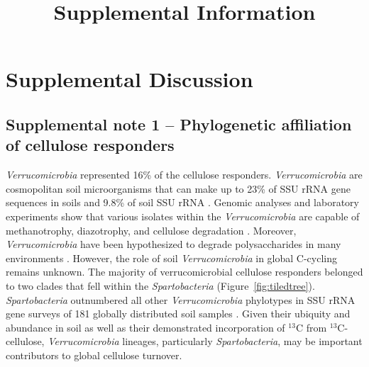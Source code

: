 \documentclass{article}
\title{Supplemental Information}
\date{\vspace{-5ex}}
\begin{document}
\linenumbers[1222]

\maketitle

\tableofcontents



\section{Supplemental Discussion}
\subsection{Supplemental note 1 -- Phylogenetic affiliation of cellulose responders}
\textit{Verrucomicrobia} represented 16\% of the cellulose responders.
\textit{Verrucomicrobia} are cosmopolitan soil microorganisms \citep{Bergmann_2011}
that can make up to 23\% of SSU rRNA gene sequences in soils
\citep{Bergmann_2011} and 9.8\% of soil SSU rRNA \citep{Buckley_2001}. Genomic
analyses and laboratory experiments show that various isolates within the
\textit{Verrucomicrobia} are capable of methanotrophy, diazotrophy, and
cellulose degradation \citep{Wertz_2011,Otsuka_2012}. Moreover,
\textit{Verrucomicrobia} have been hypothesized to degrade polysaccharides in
many environments \citep{Fierer_2013,10543821,Herlemann_2013}. However, the
role of soil \textit{Verrucomicrobia} in global C-cycling remains unknown. The
majority of verrucomicrobial cellulose responders belonged to two clades that
fell within the \textit{Spartobacteria} (Figure~\ref{fig:tiledtree}).
\textit{Spartobacteria} outnumbered all other \textit{Verrucomicrobia}
phylotypes in SSU rRNA gene surveys of 181 globally distributed soil samples
\citep{Bergmann_2011}. Given their ubiquity and abundance
in soil as well as their demonstrated incorporation of $^{13}$C from
$^{13}$C-cellulose, \textit{Verrucomicrobia} lineages, particularly
\textit{Spartobacteria}, may be important contributors to global cellulose
turnover. 
\end{document}
